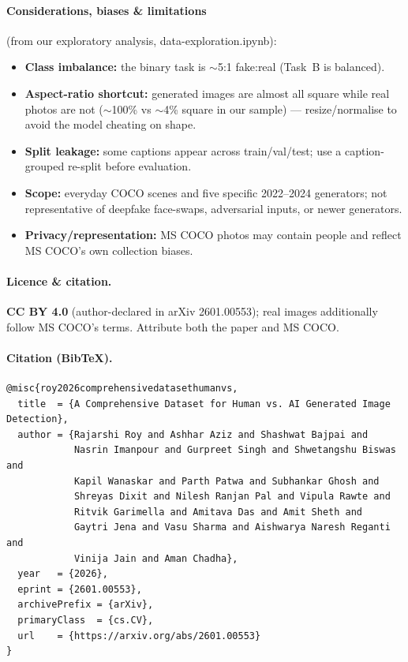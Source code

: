 \documentclass[11pt]{article}
\begin{document}
\newpage

\paragraph{Considerations, biases \& limitations} (from our exploratory analysis, data-exploration.ipynb):
\begin{itemize}[nosep,leftmargin=1.4em]
  \item \textbf{Class imbalance:} the binary task is $\sim$5:1 fake:real (Task~B is balanced).
  \item \textbf{Aspect-ratio shortcut:} generated images are almost all square while real photos are not ($\sim$100\% vs $\sim$4\% square in our sample) --- resize/normalise to avoid the model cheating on shape.
  \item \textbf{Split leakage:} some captions appear across train/val/test; use a caption-grouped re-split before evaluation.
  \item \textbf{Scope:} everyday COCO scenes and five specific 2022--2024 generators; not representative of deepfake face-swaps, adversarial inputs, or newer generators.
  \item \textbf{Privacy/representation:} MS COCO photos may contain people and reflect MS COCO's own collection biases.
\end{itemize}

\paragraph{Licence \& citation.} \textbf{CC BY 4.0} (author-declared in arXiv 2601.00553); real images additionally follow MS COCO's terms. Attribute both the paper and MS COCO.

\paragraph{Citation (BibTeX).}
\begin{verbatim}
@misc{roy2026comprehensivedatasethumanvs,
  title  = {A Comprehensive Dataset for Human vs. AI Generated Image Detection},
  author = {Rajarshi Roy and Ashhar Aziz and Shashwat Bajpai and
            Nasrin Imanpour and Gurpreet Singh and Shwetangshu Biswas and
            Kapil Wanaskar and Parth Patwa and Subhankar Ghosh and
            Shreyas Dixit and Nilesh Ranjan Pal and Vipula Rawte and
            Ritvik Garimella and Amitava Das and Amit Sheth and
            Gaytri Jena and Vasu Sharma and Aishwarya Naresh Reganti and
            Vinija Jain and Aman Chadha},
  year   = {2026},
  eprint = {2601.00553},
  archivePrefix = {arXiv},
  primaryClass  = {cs.CV},
  url    = {https://arxiv.org/abs/2601.00553}
}
\end{verbatim}
\end{document}
